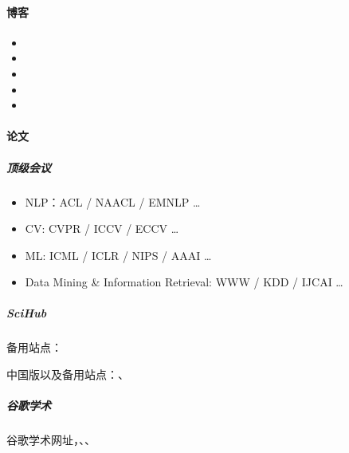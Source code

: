 \documentclass[letterpaper,10pt,english]{sphinxmanual}
\begin{document}
\paragraph{博客}
\label{\detokenize{chapter_knowledge/research:id2}}\begin{itemize}
\item {} 

\item {} 

\item {} 

\item {} 

\item {} 

\end{itemize}


\paragraph{论文}
\label{\detokenize{chapter_knowledge/research:id3}}

\subparagraph{顶级会议}
\label{\detokenize{chapter_knowledge/research:id4}}\begin{itemize}
\item {} 
NLP：ACL / NAACL / EMNLP …

\item {} 
CV: CVPR / ICCV / ECCV …

\item {} 
ML: ICML / ICLR / NIPS / AAAI …

\item {} 
Data Mining \& Information Retrieval: WWW / KDD / IJCAI …

\end{itemize}


\subparagraph{Sci\sphinxhyphen{}Hub}
\label{\detokenize{chapter_knowledge/research:sci-hub}}

备用站点：

中国版以及备用站点：、


\subparagraph{谷歌学术}
\label{\detokenize{chapter_knowledge/research:id5}}
谷歌学术网址，、、
\end{document}

